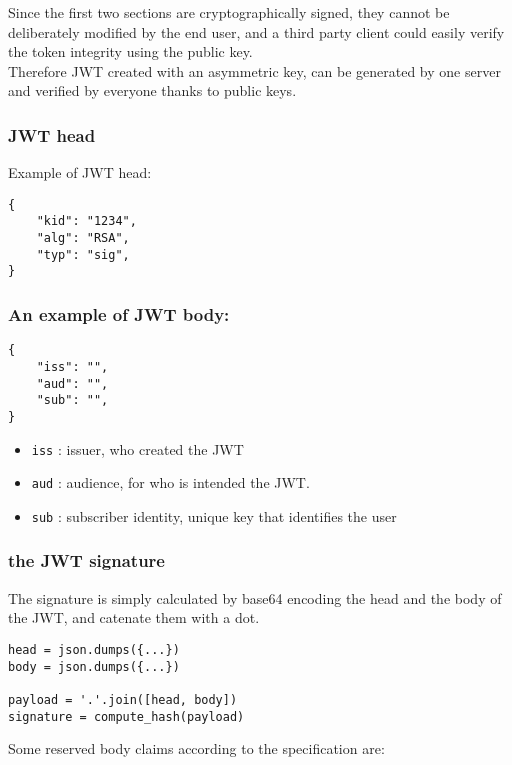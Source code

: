 Since the first two sections are cryptographically signed, they cannot be
deliberately modified by the end user, and a third party client could easily
verify the token integrity using the public key.
\\
Therefore JWT created with an asymmetric key, can be generated by one server and
verified by everyone thanks to public keys.

\subsubsection{JWT head}
Example of JWT head:
\begin{lstlisting}
{
    "kid": "1234",
    "alg": "RSA",
    "typ": "sig",
}
\end{lstlisting}

\subsubsection{An example of JWT body:}
\begin{lstlisting}
{
    "iss": "",
    "aud": "",
    "sub": "",
}
\end{lstlisting}
\begin{itemize}
    \item \texttt{iss} : issuer, who created the JWT
    \item \texttt{aud} : audience, for who is intended the JWT.
    \item \texttt{sub} : subscriber identity, unique key that identifies the
        user
\end{itemize}

\subsubsection{the JWT signature}
The signature is simply calculated by base64 encoding the head and the body of
the JWT, and catenate them with a dot.
\begin{lstlisting}
head = json.dumps({...})
body = json.dumps({...})

payload = '.'.join([head, body])
signature = compute_hash(payload)
\end{lstlisting}

Some reserved body claims according to the specification are:

